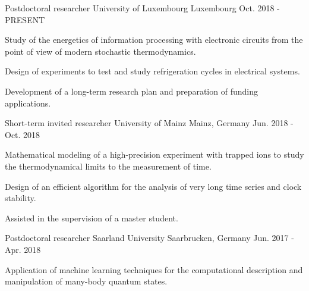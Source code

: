 

\begin{cventries}

  \cventry
    {Postdoctoral researcher} %
    {University of Luxembourg} %
    {Luxembourg} %
    {Oct. 2018 - PRESENT} %
    {
      \begin{cvitems} %
        \item {Study of the energetics of information processing with electronic circuits from the
        point of view of modern stochastic thermodynamics.}
        \item {Design of experiments to test and study refrigeration cycles in electrical systems.}
        \item {Development of a long-term research plan and preparation of funding applications.}
      \end{cvitems}
    }

  \cventry
    {Short-term invited researcher} %
    {University of Mainz} %
    {Mainz, Germany} %
    {Jun. 2018 - Oct. 2018} %
    {
      \begin{cvitems} %
        \item Mathematical modeling of a high-precision experiment with trapped ions to study the thermodynamical
        limits to the measurement of time.
        \item Design of an efficient algorithm for the analysis of very long time series and clock stability.
        \item Assisted in the supervision of a master student.
      \end{cvitems}
    }

  \cventry
    {Postdoctoral researcher} %
    {Saarland University} %
    {Saarbrucken, Germany} %
    {Jun. 2017 - Apr. 2018} %
    {
      \begin{cvitems} %
        \item Application of machine learning techniques for the computational
        description and manipulation of many-body quantum states.
      \end{cvitems}
    }


\end{cventries}
